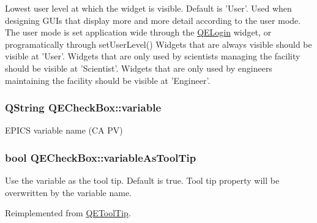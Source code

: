 \label{classQECheckBox_ae919c2bf8265005e45e2c6de44839e8e}
Lowest user level at which the widget is visible. Default is 'User'. Used when designing GUIs that display more and more detail according to the user mode. The user mode is set application wide through the \hyperlink{classQELogin}{QELogin} widget, or programatically through setUserLevel() Widgets that are always visible should be visible at 'User'. Widgets that are only used by scientists managing the facility should be visible at 'Scientist'. Widgets that are only used by engineers maintaining the facility should be visible at 'Engineer'. \hypertarget{classQECheckBox_a1d7024cc5d4615e156d0233754d903d3}{
\subsubsection[{variable}]{\setlength{\rightskip}{0pt plus 5cm}QString QECheckBox::variable}}
\label{classQECheckBox_a1d7024cc5d4615e156d0233754d903d3}
EPICS variable name (CA PV) \hypertarget{classQECheckBox_a8f507578ec9249710c149b1b5f8b88c6}{
\subsubsection[{variableAsToolTip}]{\setlength{\rightskip}{0pt plus 5cm}bool QECheckBox::variableAsToolTip}}
\label{classQECheckBox_a8f507578ec9249710c149b1b5f8b88c6}
Use the variable as the tool tip. Default is true. Tool tip property will be overwritten by the variable name. 

Reimplemented from \hyperlink{classQEToolTip}{QEToolTip}.

